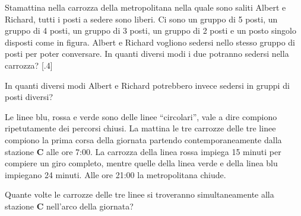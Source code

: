 \documentclass[12pt]{matemaj}
\begin{document}
\def\posto(#1,#2){\fill[rounded corners, blue] (#1+.1,#2+.1) rectangle (#1+.9,#2+.9)}
\vspace{-.3cm}
\quesitotc[10;100]
[.6]Stamattina nella carrozza della metropolitana nella quale sono saliti Albert e Richard, tutti i posti a sedere sono liberi. Ci sono un gruppo di 5 posti, un gruppo di 4 posti, un gruppo di 3 posti, un gruppo di 2 posti e un posto singolo disposti come in figura. Albert e Richard vogliono sedersi nello stesso gruppo di posti per poter conversare. In quanti diversi modi i due potranno sedersi nella carrozza?\vspace{-.3cm}
[.4]\tikspace{}\vspace{-.3cm}

\vspace{-.8cm}
\quesito[100;200]
In quanti diversi modi Albert e Richard potrebbero invece sedersi in gruppi di posti diversi?

Le linee blu, rossa e verde sono delle linee ``circolari'', vale a dire compiono ripetutamente dei percorsi chiusi. La mattina le tre carrozze delle tre linee compiono la prima corsa della giornata partendo contemporaneamente dalla stazione {\bf C} alle ore 7:00. La carrozza della linea rossa impiega 15 minuti per compiere un giro completo, mentre quelle della linea verde e della linea blu impiegano 24 minuti. Alle ore 21:00 la metropolitana chiude.

\quesito[1;20]
Quante volte le carrozze delle tre linee si troveranno simultaneamente alla stazione {\bf C} nell'arco della giornata?
\end{document}

